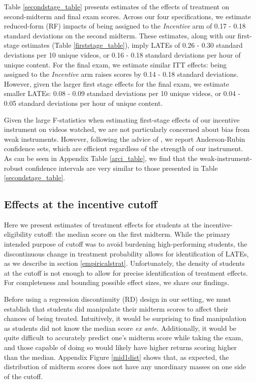 \documentclass[12pt]{article}
\begin{document}
Table \ref{secondstage_table} presents estimates of the effects of treatment on second-midterm and final exam scores. Across our four specifications, we estimate reduced-form (RF) impacts of being assigned to the \textit{Incentive} arm of 0.17 - 0.18 standard deviations on the second midterm. These estimates, along with our first-stage estimates (Table \ref{firststage_table}), imply LATEs of 0.26 - 0.30 standard deviations per 10 unique videos, or 0.16 - 0.18 standard deviations per hour of unique content. For the final exam, we estimate similar ITT effects: being assigned to the \textit{Incentive} arm raises scores by 0.14 - 0.18 standard deviations. However, given the larger first stage effects for the final exam, we estimate smaller LATEs: 0.08 - 0.09 standard deviations per 10 unique videos, or 0.04 - 0.05 standard deviations per hour of unique content.

Given the large F-statistics when estimating first-stage effects of our incentive instrument on videos watched, we are not particularly concerned about bias from weak instruments. However, following the advice of \textcite{ass2019}, we report Anderson-Rubin confidence sets, which are efficient regardless of the strength of our instrument. As can be seen in Appendix Table \ref{arci_table}, we find that the weak-instrument-robust confidence intervals are very similar to those presented in Table \ref{secondstage_table}.

\subsection{Effects at the incentive cutoff}

Here we present estimates of treatment effects for students at the incentive-eligibility cutoff: the median score on the first midterm. While the primary intended purpose of cutoff was to avoid burdening high-performing students, the discontinuous change in treatment probability allows for identification of LATEs, as we describe in section \ref{empiricalstrat}. Unfortunately, the density of students at the cutoff is not enough to allow for precise identification of treatment effects. For completeness and bounding possible effect sizes, we share our findings.

Before using a regression discontinuity (RD) design in our setting, we must establish that students did manipulate their midterm scores to affect their chances of being treated. Intuitively, it would be surprising to find manipulation as students did not know the median score \textit{ex ante}. Additionally, it would be quite difficult to accurately predict one's midterm score while taking the exam, and those capable of doing so would likely have higher returns scoring higher than the median. Appendix Figure \ref{mid1dist} shows that, as expected, the distribution of midterm scores does not have any unordinary masses on one side of the cutoff.
\end{document}
